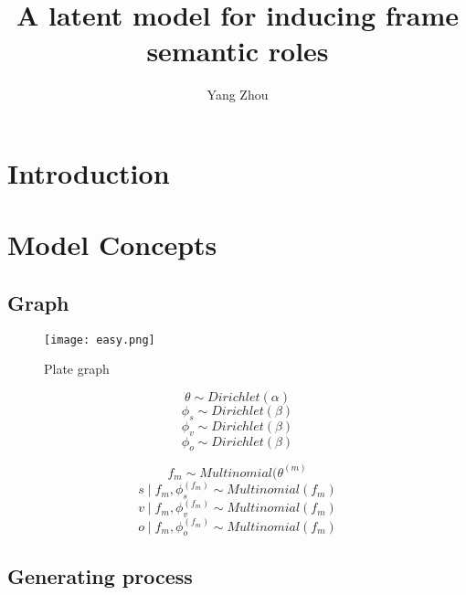 \documentclass{article}
\title{A latent model for inducing frame semantic roles}
\author{Yang Zhou}
\begin{document}
\maketitle

\section{Introduction}


\section{Model Concepts}



\subsection{Graph}

\begin{figure}[htb]
\centering
\texttt{[image: easy.png]}
\caption{Plate graph}
\label{Figure 1}
\end{figure}


$$\theta	\sim Dirichlet(\alpha)$$
$$\phi_s \sim Dirichlet(\beta)$$ 
$$\phi_v \sim Dirichlet(\beta)$$
$$\phi_o \sim Dirichlet(\beta)$$


$$f_m \sim Multinomial(\theta^{(m)}$$
$$s \mid f_m, \phi_s^{(f_m)} \sim Multinomial(f_m)$$
$$v \mid f_m, \phi_v^{(f_m)} \sim Multinomial(f_m)$$
$$o \mid f_m, \phi_o^{(f_m)} \sim Multinomial(f_m)$$

\subsection{Generating process}
\end{document}
